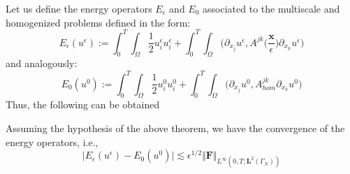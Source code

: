 Let us define the energy operators $E_{\epsilon}$ and $E_{0}$ associated to the multiscale and homogenized problems defined in the form:
\begin{equation*}
    E_{\epsilon}(u^{\epsilon}) := \int_0^T \int_{\Omega} \frac{1}{2}u_i^{\epsilon}u_i^{\epsilon} + \int_0^T \int_{\Omega} \big( \partial_{x_j} u^{\epsilon}, A^{jk} \big( \frac{\mathbf{x}}{\epsilon}\big) \partial_{x_k} u^{\epsilon} \big)
\end{equation*}
and analogously:
\begin{equation*}
    E_0(u^0) := \int_0^T \int_{\Omega} \frac{1}{2}u_i^{0}u_i^{0} + \int_0^T \int_{\Omega} \big( \partial_{x_j} u^0, A^{jk}_{hom} \partial_{x_k} u^0 \big)
\end{equation*}
Thus, the following can be obtained
\begin{lem}
Assuming the hypothesis of the above theorem, we have the convergence of the energy operators, i.e., 
\begin{equation*}
    \vert E_{\epsilon} (u^{\epsilon}) - E_0 (u^0) \vert \lesssim \epsilon^{1/2} \Vert \mathbf{F} \Vert_{L^{\infty}(0,T; \mathbf{L}^{2}(\Gamma_N))} 
\end{equation*}
\end{lem}
